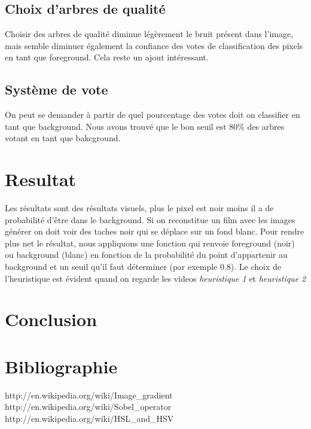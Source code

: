 \documentclass[8pt,a4paper]{report}
\begin{document}
\begin{multicols}{2}
	\subsection{Choix d'arbres de qualité}
	Choisir des arbres de qualité diminue légèrement le bruit présent dans l'image, mais semble diminuer également la confiance des votes
	de classification des pixels en tant que foreground. Cela reste un ajout intéressant. 

	\subsection{Système de vote}
	On peut se demander à partir de quel pourcentage des votes doit on classifier en tant que background. Nous avons trouvé que le bon
	seuil est 80\% des arbres votant en tant que bakcground.

\section{Resultat}
Les résultats sont des résultats visuels, plus le pixel est noir moins il a de probabilité d'être dans le background. Si on reconstitue un film avec les images générer on doit voir des taches noir qui se déplace sur un fond blanc. Pour rendre plus net le résultat, nous appliquons une fonction qui renvoie foreground (noir) ou background (blanc) en fonction de la probabilité du point d'appartenir au background et un seuil qu'il faut déterminer (par exemple 0.8). 
Le choix de l'heuristique est évident quand on regarde les videos \textit{heuristique 1} et \textit{heuristique 2}

\section{Conclusion}

	
	
\section{Bibliographie}	
\begin{thebibliography}{2}
    http://en.wikipedia.org/wiki/Image\_gradient
    http://en.wikipedia.org/wiki/Sobel\_operator
    http://en.wikipedia.org/wiki/HSL\_and\_HSV  
\end{thebibliography}

\end{multicols}
\end{document}
